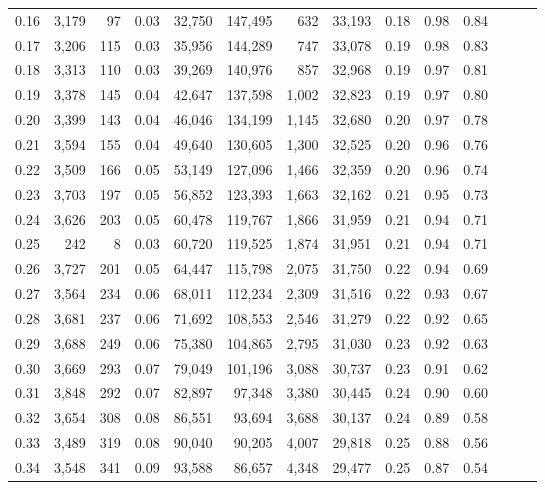 \begin{tabular}{rrrrrrrrrrrrrr}
0.16 &  3,179 &   97 &  0.03 &   32,750 &  147,495 &     632 &  33,193 &  0.18 &  0.98 &      0.84 \\
0.17 &  3,206 &  115 &  0.03 &   35,956 &  144,289 &     747 &  33,078 &  0.19 &  0.98 &      0.83 \\
0.18 &  3,313 &  110 &  0.03 &   39,269 &  140,976 &     857 &  32,968 &  0.19 &  0.97 &      0.81 \\
0.19 &  3,378 &  145 &  0.04 &   42,647 &  137,598 &   1,002 &  32,823 &  0.19 &  0.97 &      0.80 \\
0.20 &  3,399 &  143 &  0.04 &   46,046 &  134,199 &   1,145 &  32,680 &  0.20 &  0.97 &      0.78 \\
0.21 &  3,594 &  155 &  0.04 &   49,640 &  130,605 &   1,300 &  32,525 &  0.20 &  0.96 &      0.76 \\
0.22 &  3,509 &  166 &  0.05 &   53,149 &  127,096 &   1,466 &  32,359 &  0.20 &  0.96 &      0.74 \\
0.23 &  3,703 &  197 &  0.05 &   56,852 &  123,393 &   1,663 &  32,162 &  0.21 &  0.95 &      0.73 \\
0.24 &  3,626 &  203 &  0.05 &   60,478 &  119,767 &   1,866 &  31,959 &  0.21 &  0.94 &      0.71 \\
0.25 &    242 &    8 &  0.03 &   60,720 &  119,525 &   1,874 &  31,951 &  0.21 &  0.94 &      0.71 \\
0.26 &  3,727 &  201 &  0.05 &   64,447 &  115,798 &   2,075 &  31,750 &  0.22 &  0.94 &      0.69 \\
0.27 &  3,564 &  234 &  0.06 &   68,011 &  112,234 &   2,309 &  31,516 &  0.22 &  0.93 &      0.67 \\
0.28 &  3,681 &  237 &  0.06 &   71,692 &  108,553 &   2,546 &  31,279 &  0.22 &  0.92 &      0.65 \\
0.29 &  3,688 &  249 &  0.06 &   75,380 &  104,865 &   2,795 &  31,030 &  0.23 &  0.92 &      0.63 \\
0.30 &  3,669 &  293 &  0.07 &   79,049 &  101,196 &   3,088 &  30,737 &  0.23 &  0.91 &      0.62 \\
0.31 &  3,848 &  292 &  0.07 &   82,897 &   97,348 &   3,380 &  30,445 &  0.24 &  0.90 &      0.60 \\
0.32 &  3,654 &  308 &  0.08 &   86,551 &   93,694 &   3,688 &  30,137 &  0.24 &  0.89 &      0.58 \\
0.33 &  3,489 &  319 &  0.08 &   90,040 &   90,205 &   4,007 &  29,818 &  0.25 &  0.88 &      0.56 \\
0.34 &  3,548 &  341 &  0.09 &   93,588 &   86,657 &   4,348 &  29,477 &  0.25 &  0.87 &      0.54 \\

\end{tabular}
